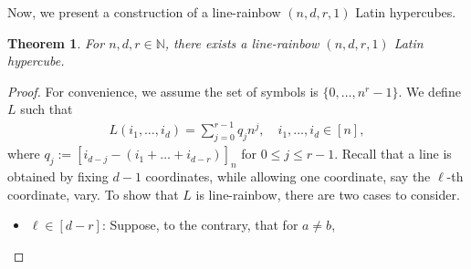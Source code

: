 \documentclass[11pt,oneside]{amsart}
\newtheorem{theorem}{Theorem}[section]
\begin{document}
{Now, we present a construction of a line-rainbow  $(n,d,r,1)$ Latin hypercubes.  
\begin{theorem} \label{lemmaLrainbowcube}
    For $n,d,r\in\mathbb{N}$, there exists a line-rainbow $(n,d,r,1)$ Latin hypercube.  
\end{theorem}
\begin{proof} For  convenience, we assume the set of symbols is $\{0,\dots, n^r-1\}$.    We define $L$ such that  %
    \begin{align*}
        L(i_1,\dots,i_d)= \sum_{j=0}^{r-1} q_j n^{j}, \quad i_1,\dots,i_d \in [n],
    \end{align*}
where $q_j:=\left[i_{d-j} - (i_1+\dots+i_{d-r})\right]_n$ for $0\leq j\leq r-1$.
Recall that a line is obtained by fixing $d-1$ coordinates, while allowing one coordinate, say the $\ell$-th coordinate, vary. To show that $L$ is line-rainbow, there are two cases to consider. 
\begin{itemize}
    \item $\ell\in [d-r]$: Suppose, to the contrary, that  for $a\neq b$,


\end{itemize}
\end{proof}}
\end{document}
